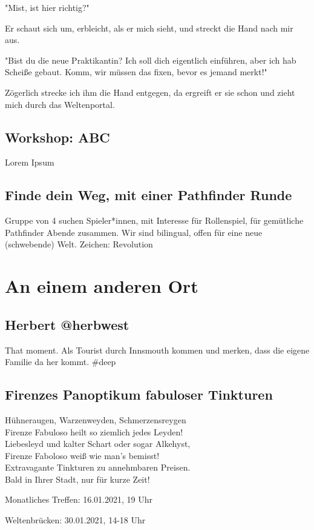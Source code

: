 \documentclass[final]{multiversum}
\begin{document}
"Mist, ist hier richtig?"

Er schaut sich um, erbleicht, als er mich sieht, und streckt die Hand nach mir aus.

"Bist du die neue Praktikantin? Ich soll dich eigentlich einführen, aber ich hab Scheiße gebaut. Komm, wir müssen das fixen, bevor es jemand merkt!"

Zögerlich strecke ich ihm die Hand entgegen, da ergreift er sie schon und zieht mich durch das Weltenportal.


\subsection{Workshop: ABC}
Lorem Ipsum



\subsection{Finde dein Weg, mit einer Pathfinder Runde}
Gruppe von 4 suchen Spieler*innen, mit Interesse für Rollenspiel, für gemütliche Pathfinder Abende zusammen.
Wir sind bilingual, offen für eine neue (schwebende) Welt.
Zeichen: Revolution

\section{An einem anderen Ort}

\subsection{Herbert @herbwest}
That moment. Als Tourist durch Innsmouth kommen und merken, dass die eigene Familie da her kommt. \#deep

\subsection{Firenzes Panoptikum fabuloser Tinkturen}
Hühneraugen, Warzenweyden, Schmerzensreygen\\
Firenze Fabuloso heilt so ziemlich jedes Leyden!\\
Liebesleyd und kalter Schart oder sogar Alkehyst,\\
Firenze Faboloso weiß wie man's bemisst!\\[1em]

Extravagante Tinkturen zu annehmbaren Preisen.\\
Bald in Ihrer Stadt, nur für kurze Zeit! 


\begin{termine}
\item Monatliches Treffen: 16.01.2021, 19 Uhr
\item Weltenbrücken: 30.01.2021, 14-18 Uhr
\end{termine}
\impressum
\end{document}
